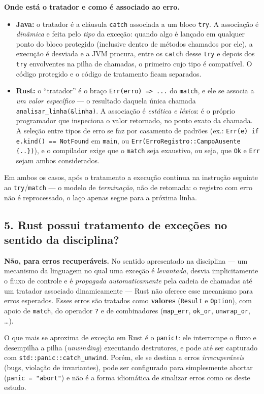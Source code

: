 \documentclass[11pt,a4paper]{article}
\newcommand{\code}[1]{\texttt{#1}}
\begin{document}
\textbf{Onde está o tratador e como é associado ao erro.}
\begin{itemize}
  \item \textbf{Java:} o tratador é a cláusula \code{catch} associada a um
    bloco \code{try}. A associação é \emph{dinâmica} e feita pelo
    \emph{tipo} da exceção: quando algo é lançado em qualquer ponto do
    bloco protegido (inclusive dentro de métodos chamados por ele), a
    execução é desviada e a JVM procura, entre os \code{catch} desse
    \code{try} e depois dos \code{try} envolventes na pilha de chamadas,
    o primeiro cujo tipo é compatível. O código protegido e o código de
    tratamento ficam separados.
  \item \textbf{Rust:} o ``tratador'' é o braço \code{Err(erro) => ...} do
    \code{match}, e ele se associa a \emph{um valor específico} --- o
    resultado daquela única chamada \code{analisar\_linha(\&linha)}. A
    associação é \emph{estática e léxica}: é o próprio programador que
    inspeciona o valor retornado, no ponto exato da chamada. A seleção entre
    tipos de erro se faz por casamento de padrões (ex.:
    \code{Err(e) if e.kind() == NotFound} em \code{main}, ou
    \code{Err(ErroRegistro::CampoAusente \{..\})}), e o compilador exige
    que o \code{match} seja exaustivo, ou seja, que \code{Ok} e \code{Err}
    sejam ambos considerados.
\end{itemize}
Em ambos os casos, após o tratamento a execução continua na instrução
seguinte ao \code{try}/\code{match} --- o modelo de \emph{terminação}, não
de retomada: o registro com erro não é reprocessado, o laço apenas segue
para a próxima linha.

\subsection*{5. Rust possui tratamento de exceções no sentido da disciplina?}

\textbf{Não, para erros recuperáveis.} No sentido apresentado na disciplina
--- um mecanismo da linguagem no qual uma exceção é \emph{levantada},
desvia implicitamente o fluxo de controle e é \emph{propagada
automaticamente} pela cadeia de chamadas até um tratador associado
dinamicamente --- Rust não oferece esse mecanismo para erros esperados.
Esses erros são tratados como \textbf{valores} (\code{Result} e
\code{Option}), com apoio de \code{match}, do operador \code{?} e de
combinadores (\code{map\_err}, \code{ok\_or}, \code{unwrap\_or}, \dots).

O que mais se aproxima de exceção em Rust é o \code{panic!}: ele interrompe
o fluxo e desempilha a pilha (\emph{unwinding}) executando destrutores, e
pode até ser capturado com \code{std::panic::catch\_unwind}. Porém, ele se
destina a erros \emph{irrecuperáveis} (bugs, violação de invariantes),
pode ser configurado para simplesmente abortar (\code{panic = "abort"}) e
não é a forma idiomática de sinalizar erros como os deste estudo.
\end{document}
